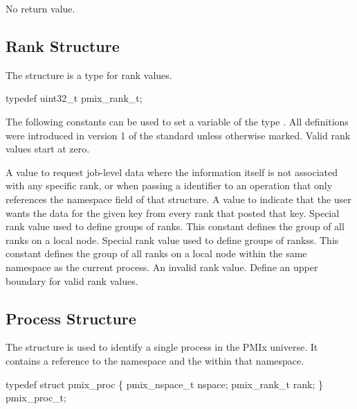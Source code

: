 No return value.


\subsection{Rank Structure}

The  structure is a  type for rank values.

\cspecificstart
\begin{codepar}
typedef uint32_t pmix_rank_t;
\end{codepar}
\cspecificend

The following constants can be used to set a variable of the type . All definitions were introduced in version 1 of the standard unless otherwise marked. Valid rank values start at zero.

\begin{constantdesc}
%
A value to request job-level data where the information itself is not associated with any specific rank, or when passing a  identifier to an operation that only references the namespace field of that structure.
%
A value to indicate that the user wants the data for the given key from every rank that posted that key.
%
Special rank value used to define groups of ranks.
This constant defines the group of all ranks on a local node.
%
Special rank value used to define groups of rankss.
This constant defines the group of all ranks on a local node within the same namespace as the current process.
%
An invalid rank value.
%
Define an upper boundary for valid rank values.
%
\end{constantdesc}


\subsection{Process Structure}

The  structure is used to identify a single process in the PMIx universe.
It contains a reference to the namespace and the  within that namespace.

\cspecificstart
\begin{codepar}
typedef struct pmix_proc \{
    pmix_nspace_t nspace;
    pmix_rank_t rank;
\} pmix_proc_t;
\end{codepar}
\cspecificend

